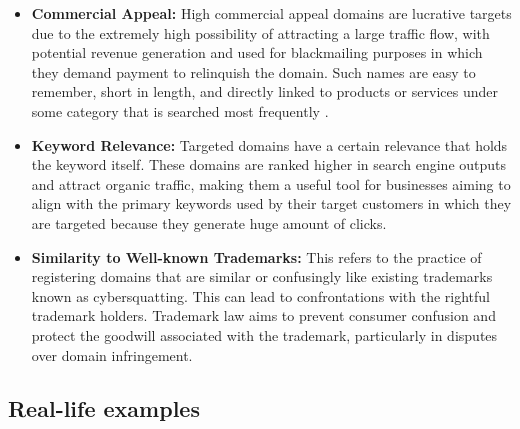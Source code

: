 \begin{itemize}
  \item \textbf{Commercial Appeal:} High commercial appeal domains are lucrative targets due to the extremely high possibility of attracting a large traffic flow, with potential revenue generation and used for blackmailing purposes in which they demand payment to relinquish the domain. Such names are easy to remember, short in length, and directly linked to products or services under some category that is searched most frequently \cite{Li2002ConflictDomainTrademark}.
  
  \item \textbf{Keyword Relevance:} Targeted domains have a certain relevance that holds the keyword itself. These domains are ranked higher in search engine outputs and attract organic traffic, making them a useful tool for businesses aiming to align with the primary keywords used by their target customers in which they are targeted because they generate huge amount of clicks.
  
  \item \textbf{Similarity to Well-known Trademarks:} This refers to the practice of registering domains that are similar or confusingly like existing trademarks known as cybersquatting. This can lead to confrontations with the rightful trademark holders. Trademark law aims to prevent consumer confusion and protect the goodwill associated with the trademark, particularly in disputes over domain infringement.
\end{itemize}

\subsection{Real-life examples}

